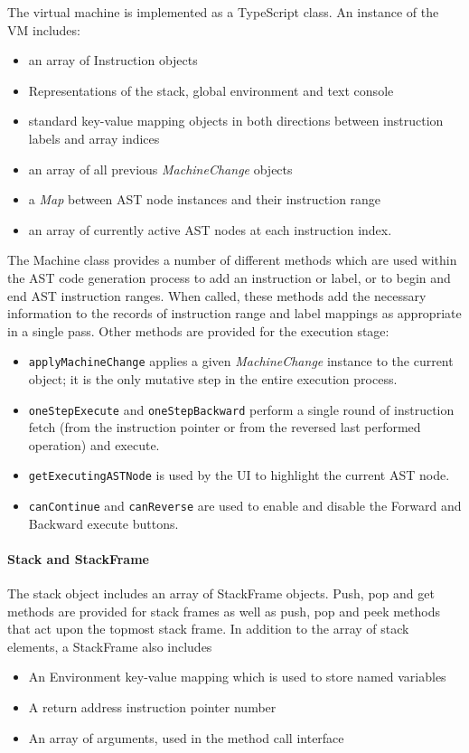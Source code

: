 The virtual machine is implemented as a TypeScript class. An instance of the VM includes:
\begin{itemize}

\item an array of Instruction objects
\item Representations of the stack, global environment and text console
\item standard key-value mapping objects in both directions between instruction labels and array indices
\item an array of all previous \textit{MachineChange} objects
\item a \textit{Map} between AST node instances and their instruction range
\item an array of currently active AST nodes at each instruction index.
\end{itemize}
The Machine class provides a number of different methods which are used within the AST code generation process to add an instruction or label, or to begin and end AST instruction ranges. When called, these methods add the necessary information to the records of instruction range and label mappings as appropriate in a single pass. Other methods are provided for the execution stage:

\begin{itemize}
\item \verb+applyMachineChange+ applies a given \textit{MachineChange} instance to the current object; it is the only mutative step in the entire execution process.
\item \verb+oneStepExecute+ and \verb+oneStepBackward+ perform a single round of instruction fetch (from the instruction pointer or from the reversed last performed operation) and execute.
\item \verb+getExecutingASTNode+ is used by the UI to highlight the current AST node.
\item \verb+canContinue+ and \verb+canReverse+ are used to enable and disable the Forward and Backward execute buttons.
\end{itemize}

\paragraph{Stack and StackFrame}

The stack object includes an array of StackFrame objects. Push, pop and get methods are provided for stack frames as well as push, pop and peek methods that act upon the topmost stack frame. In addition to the array of stack elements, a StackFrame also includes
\begin{itemize}
\item An Environment key-value mapping which is used to store named variables
\item A return address instruction pointer number
\item An array of arguments, used in the method call interface
\end{itemize}


